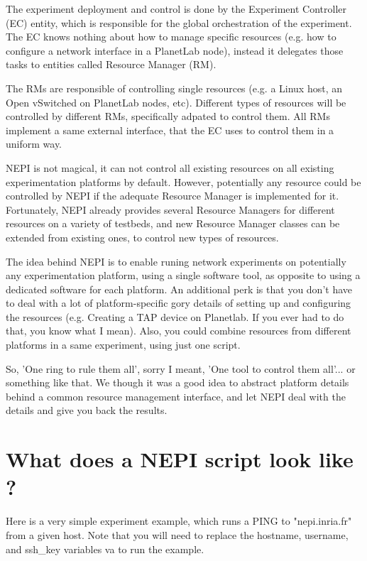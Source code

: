 The experiment deployment and control is done by the
Experiment Controller (EC) entity, which is responsible for the 
global orchestration of the experiment. 
The EC knows nothing about how to manage specific resources 
(e.g. how to configure a network interface in a PlanetLab node),
instead it delegates those tasks to entities called Resource Manager (RM).

The RMs are responsible of controlling single resources 
(e.g. a Linux host, an Open vSwitched on PlanetLab 
nodes, etc). Different types of resources will be controlled by
different RMs, specifically adpated to control them.
All RMs implement a same external interface, that the EC uses 
to control them in a uniform way.

NEPI is not magical, it can not control all existing resources
on all existing experimentation platforms by default.
However, potentially any resource could be controlled by 
NEPI if the adequate Resource Manager is implemented for it.
Fortunately, NEPI already provides several Resource Managers for
different resources on a variety of testbeds, and new 
Resource Manager classes can be extended from existing ones,
to control new types of resources. 

The idea behind NEPI is to enable runing network experiments on 
potentially any experimentation platform, using a single
software tool, as opposite to using a dedicated software for 
each platform. An additional perk is that you don't have to deal 
with a lot of platform-specific gory details of setting up and 
configuring the resources (e.g. Creating a TAP device on Planetlab.
If you ever had to do that, you know what I mean). Also, 
you could combine resources from different platforms in a same
experiment, using just one script.

So, 'One ring to rule them all', sorry I meant, 'One tool to 
control them all'... or something like that.
We though it was a good idea to abstract platform details
behind a common resource management interface, and let 
NEPI deal with the details and give you back the results.

\section{What does a NEPI script look like ?}
\label{faq:ping_example}

Here is a very simple experiment example, which runs a PING
to "nepi.inria.fr" from a given host.
Note that you will need to replace the hostname, username, and
ssh\_key variables va to run the example. 

